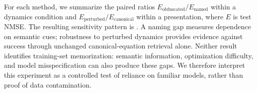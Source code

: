 For each method, we summarize the paired ratios
$E_{\mathrm{obfuscated}}/E_{\mathrm{named}}$ within a dynamics condition and
$E_{\mathrm{perturbed}}/E_{\mathrm{canonical}}$ within a presentation, where
$E$ is test NMSE. The resulting sensitivity pattern is
.
A naming gap measures dependence on semantic cues; robustness to perturbed
dynamics provides evidence against success through unchanged canonical-equation
retrieval alone. Neither result identifies training-set memorization: semantic
information, optimization difficulty, and model misspecification can also
produce these gaps. We therefore interpret this experiment as a controlled
test of reliance on familiar models, rather than proof of data contamination.
